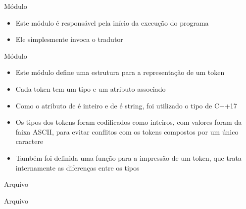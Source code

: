 \begin{frame}[fragile]{Módulo }

    \begin{itemize}
        \item Este módulo é responsável pela início da execução do programa
        \pause

        \item Ele simplesmente invoca o tradutor
    \end{itemize}
    \pause


\end{frame}

\begin{frame}[fragile]{Módulo }

    \begin{itemize}
        \item Este módulo define uma estrutura para a representação de um token
        \pause

        \item Cada token tem um tipo e um atributo associado
        \pause

        \item Como o atributo de  é inteiro e de  é string, foi utilizado o tipo  de C++17
        \pause

        \item Os tipos dos tokens foram codificados como inteiros, com valores foram da faixa ASCII, para evitar conflitos com os tokens compostos por um
            único caractere
        \pause

        \item Também foi definida uma função para a impressão de um token, que trata internamente as diferenças entre os tipos
    \end{itemize}

\end{frame}

\begin{frame}[fragile]{Arquivo }
\end{frame}

\begin{frame}[fragile]{Arquivo }
\end{frame}


